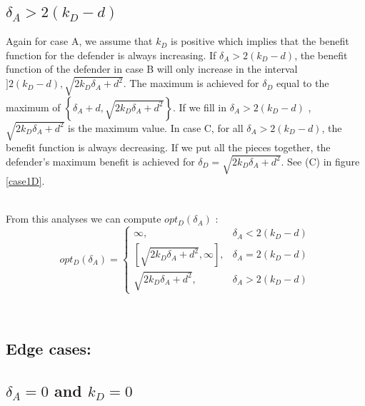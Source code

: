 \subsection*{$\delta_{A} > 2(k_{D} - d)$ }
Again for case A, we assume that $k_{D}$ is positive which implies that the benefit function for the defender is always increasing. If $\delta_{A} > 2(k_{D} - d)$, the benefit function of the defender in case B will only increase in the interval $]2(k_{D} - d), \sqrt{2k_{D}\delta_{A} + d^{2}}$. The maximum is achieved for $\delta_{D}$ equal to the maximum of $\left\lbrace \delta_{A}+d, \sqrt{2k_{D}\delta_{A} + d^{2}}\right\rbrace $. If we fill in $\delta_{A} > 2(k_{D} - d)$ , $\sqrt{2k_{D}\delta_{A} + d^{2}}$ is the maximum value. In case C, for all $\delta_{A} > 2(k_{D} - d)$, the benefit function is always decreasing. If we put all the pieces together, the defender's maximum benefit is achieved for $\delta_{D} = \sqrt{2k_{D}\delta_{A} + d^{2}}$. See (C) in figure \ref{case1D}.



~~\\
From this analyses we can compute $opt_{D}(\delta_{A})$ : \\

 \begin{displaymath}
  opt_{D}(\delta_{A}) = \left\{
     \begin{array}{lr}
          \infty , & \delta_{A} < 2(k_{D} - d)\\
      \left[ \sqrt{2k_{D}\delta_{A} + d^{2}},\infty\right] , & \delta_{A} = 2(k_{D} - d) \\
      \sqrt{2k_{D}\delta_{A} + d^{2}}, & \delta_{A} > 2(k_{D} - d)
     \end{array}
   \right.
\end{displaymath}

~~\\


\subsection*{Edge cases:}

\subsection*{$\delta_{A}=0$ and $k_{D}=0$}

